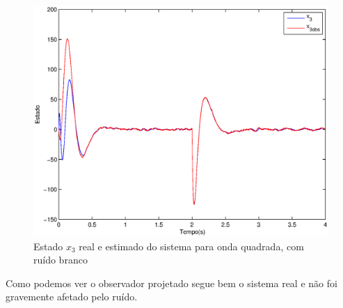 \documentclass{article}
\begin{document}
\begin{figure}[H]
	\centering
	\includegraphics[width=0.8\linewidth]{../obsx3}
	\caption{Estado $x_3$ real e estimado do sistema para onda quadrada, com ruído branco}
	\label{fig:obsx3}
\end{figure}
Como podemos ver o observador projetado segue bem o sistema real e não foi gravemente afetado pelo ruído.
\end{document}
